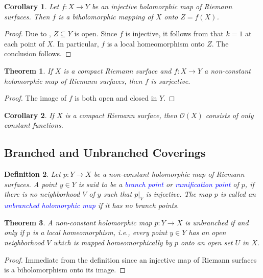 \documentclass[12pt]{article}
\theoremstyle{thmstyle}
\newtheorem{theorem}{Theorem}[section]
\theoremstyle{defstyle}
\newtheorem{definition}[theorem]{Definition}
\newtheorem*{corollary}{Corollary}
\newcommand{\define}[1]{\textcolor{blue}{\textit{#1}}}
\newcommand{\scrO}{\mathscr{O}}
\begin{document}
\begin{corollary}
    Let $f: X\to Y$ be an injective holomorphic map of Riemann surfaces. Then $f$ is a biholomorphic mapping of $X$ onto $Z = f(X)$.
\end{corollary}
\begin{proof}
    Due to , $Z\subseteq Y$ is open. Since $f$ is injective, it follows from  that $k = 1$ at each point of $X$. In particular, $f$ is a local homeomorphism onto $Z$. The conclusion follows.
\end{proof}

\begin{theorem}
    If $X$ is a compact Riemann surface and $f: X\to Y$ a non-constant holomorphic map of Riemann surfaces, then $f$ is surjective.
\end{theorem}
\begin{proof}
    The image of $f$ is both open and closed in $Y$.
\end{proof}
\begin{corollary}
    If $X$ is a compact Riemann surface, then $\scrO(X)$ consists of only constant functions.
\end{corollary}

\subsection{Branched and Unbranched Coverings}

\begin{definition}
    Let $p: Y\to X$ be a non-constant holomorphic map of Riemann surfaces. A point $y\in Y$ is said to be a \define{branch point} or \define{ramification point} of $p$, if there is no neighborhood $V$ of $y$ such that $p|_V$ is injective. The map $p$ is called an \define{unbranched holomorphic map} if it has no branch points.
\end{definition}

\begin{theorem}
    A non-constant holomorphic map $p: Y\to X$ is unbranched if and only if $p$ is a local homeomorphism, i.e., every point $y\in Y$ has an open neighborhood $V$ which is mapped homeomorphically by $p$ onto an open set $U$ in $X$.
\end{theorem}
\begin{proof}
    Immediate from the definition since an injective map of Riemann surfaces is a biholomorphism onto its image.
\end{proof}
\end{document}
